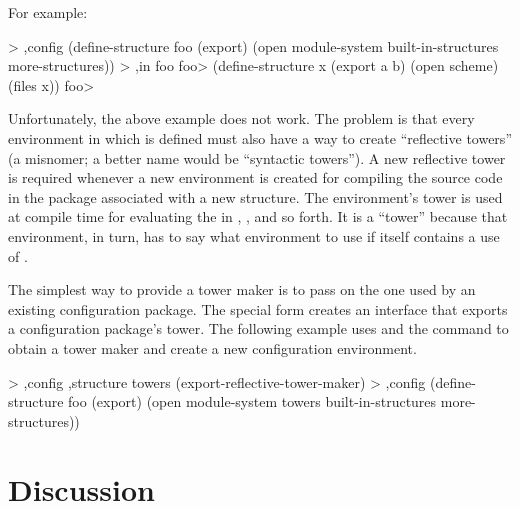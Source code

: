 For example:
\begin{example}
> ,config (define-structure foo (export)
            (open module-system
                  built-in-structures
                  more-structures))
> ,in foo
foo> (define-structure x (export a b)
       (open scheme)
       (files x))
foo> 
\end{example}

Unfortunately, the above example does not work.
The problem is that every environment in which
  is defined must also have a way to
 create ``reflective towers'' (a misnomer; a better name would be
 ``syntactic towers'').
A new reflective tower is required whenever a new environment is created for
 compiling the source code in the package associated with a new structure.
The environment's tower is used at compile time for
 evaluating the  in
 ,
 ,
 and so forth.
It is a ``tower'' because that environment, in turn, has to say what environment
 to use if  itself contains a use of .

The simplest way to provide a tower maker is to pass on the one used by
 an existing configuration package.
The special form  creates an interface
 that exports a configuration package's tower.
The following example uses  and
 the  command to obtain a tower maker and create a new
 configuration environment.

\begin{example}
> ,config ,structure towers (export-reflective-tower-maker)
> ,config (define-structure foo (export)
            (open module-system
                  towers
                  built-in-structures
                  more-structures))
\end{example}


\section{Discussion}

